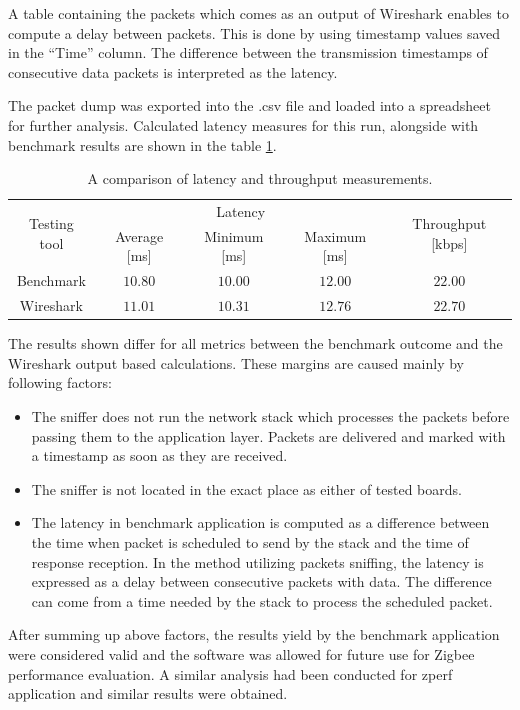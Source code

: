 A table containing the packets which comes as an output of Wireshark enables
to compute a delay between packets. This is done by using timestamp values
saved in the ``Time'' column. The difference between the transmission 
timestamps of consecutive data packets is interpreted as the latency. 

The packet dump was exported into the .csv file and loaded into a spreadsheet 
for further analysis. Calculated latency measures for this run, alongside with
benchmark results are shown in the table \ref{table:verification}.

\begin{table}[H]
\centering
\begin{tabular}{|c|c|c|c|c|}
\hline
\multirow{2}{*}{Testing tool} & \multicolumn{3}{c|}{Latency} & \multirow{2}{*}{Throughput [kbps]}  \\\cline{2-4}

                  & Average [ms] & Minimum [ms] & Maximum [ms]               &                   \\
\hline
Benchmark & $ 10.80 $  & $ 10.00 $ & $ 12.00 $   &      $22.00$              \\
\hline
Wireshark &  $11.01$ & $10.31$ & $12.76$      &      $22.70$  \\
\hline
\end{tabular}
\caption{A comparison of latency and throughput measurements.}
\label{table:verification}
\end{table}

The results shown differ for all metrics between the benchmark outcome and the 
Wireshark output based calculations. These margins are caused mainly by 
following factors:

\begin{itemize}
    \itemsep0em
    \item The sniffer does not run the network stack which processes the packets before passing them to the application layer. Packets are delivered and marked with a timestamp as soon as they are received.
    \item The sniffer is not located in the exact place as either of tested boards.
    \item The latency in benchmark application is computed as a difference between the time when packet is scheduled to send by the stack and the time
    of response reception. In the method utilizing packets sniffing, the latency
    is expressed as a delay between consecutive packets with data. The difference can come from a time needed by the stack to process the scheduled packet.
\end{itemize}

After summing up above factors, the results yield by the benchmark application
were considered valid and the software was allowed for future use for Zigbee 
performance evaluation. A similar analysis had been conducted for zperf 
application and similar results were obtained. 
